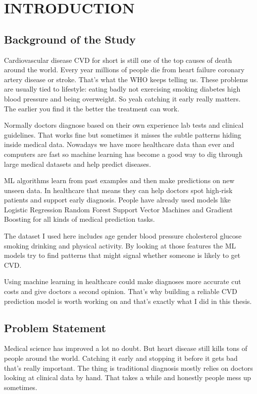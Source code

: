 \documentclass[11pt, a4paper, oneside]{book}
\begin{document}
\mainmatter
{}

\chapter{INTRODUCTION}

\section{Background of the Study}
Cardiovascular disease CVD for short is still one of the top causes of death around the world. Every year millions of people die from heart failure coronary artery disease or stroke. That's what the WHO keeps telling us. These problems are usually tied to lifestyle: eating badly not exercising smoking diabetes high blood pressure and being overweight. So yeah catching it early really matters. The earlier you find it the better the treatment can work.

Normally doctors diagnose based on their own experience lab tests and clinical guidelines. That works fine but sometimes it misses the subtle patterns hiding inside medical data. Nowadays we have more healthcare data than ever and computers are fast so machine learning has become a good way to dig through large medical datasets and help predict diseases.

ML algorithms learn from past examples and then make predictions on new unseen data. In healthcare that means they can help doctors spot high‑risk patients and support early diagnosis. People have already used models like Logistic Regression Random Forest Support Vector Machines and Gradient Boosting for all kinds of medical prediction tasks.

The dataset I used here includes age gender blood pressure cholesterol glucose smoking drinking and physical activity. By looking at those features the ML models try to find patterns that might signal whether someone is likely to get CVD.

Using machine learning in healthcare could make diagnoses more accurate cut costs and give doctors a second opinion. That's why building a reliable CVD prediction model is worth working on and that's exactly what I did in this thesis.

\section{Problem Statement}
Medical science has improved a lot no doubt. But heart disease still kills tons of people around the world. Catching it early and stopping it before it gets bad that's really important. The thing is traditional diagnosis mostly relies on doctors looking at clinical data by hand. That takes a while and honestly people mess up sometimes.
\end{document}
